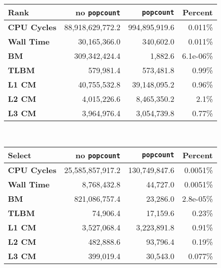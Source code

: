\begin{tabular}{|l|r|r|r|}
\hline
\textbf{Rank} & no \texttt{popcount} & \texttt{popcount} & Percent \\ \hline
\textbf{CPU Cycles} & 88,918,629,772.2 & 994,895,919.6 & 0.011\% \\ \hline
\textbf{Wall Time} & 30,165,366.0 & 340,602.0 & 0.011\% \\ \hline
\textbf{BM} & 309,342,424.4 & 1,882.6 & 6.1e-06\% \\ \hline
\textbf{TLBM} & 579,981.4 & 573,481.8 & 0.99\% \\ \hline
\textbf{L1 CM} & 40,755,532.8 & 39,148,095.2 & 0.96\% \\ \hline
\textbf{L2 CM} & 4,015,226.6 & 8,465,350.2 & 2.1\% \\ \hline
\textbf{L3 CM} & 3,964,976.4 & 3,054,739.8 & 0.77\% \\ \hline
\end{tabular}\\[5pt]
\begin{tabular}{|l|r|r|r|}
\hline
\textbf{Select} & no \texttt{popcount} & \texttt{popcount} & Percent \\ \hline
\textbf{CPU Cycles} & 25,585,857,917.2 & 130,749,847.6 & 0.0051\% \\ \hline
\textbf{Wall Time} & 8,768,432.8 & 44,727.0 & 0.0051\% \\ \hline
\textbf{BM} & 821,086,757.4 & 23,286.0 & 2.8e-05\% \\ \hline
\textbf{TLBM} & 74,906.4 & 17,159.6 & 0.23\% \\ \hline
\textbf{L1 CM} & 3,527,068.4 & 3,223,891.8 & 0.91\% \\ \hline
\textbf{L2 CM} & 482,888.6 & 93,796.4 & 0.19\% \\ \hline
\textbf{L3 CM} & 399,019.4 & 30,543.0 & 0.077\% \\ \hline
\end{tabular}\\[5pt]
